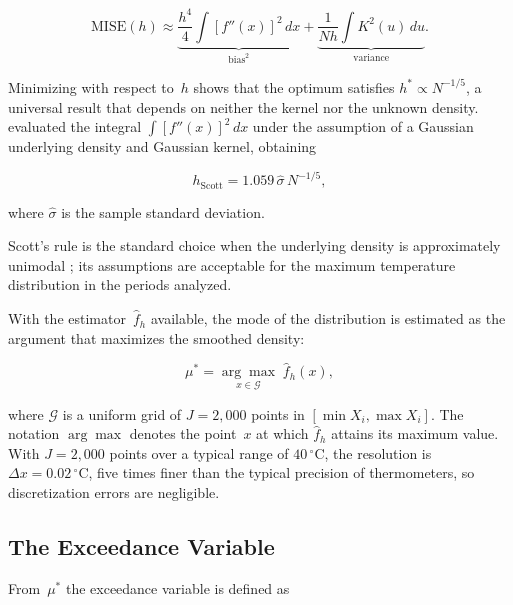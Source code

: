 \documentclass[APA,STIX1COL]{WileyNJD-v2}
\begin{document}
\begin{equation}\label{eq:mise}
\mathrm{MISE}(h)
  \approx \underbrace{\frac{h^4}{4}
            \int[f''(x)]^2\,dx}_{\mathrm{bias}^2}
  + \underbrace{\frac{1}{Nh}
            \int K^2(u)\,du}_{\mathrm{variance}}.
\end{equation}

\medskip

Minimizing with respect to~$h$ shows that the optimum satisfies
$h^*\propto N^{-1/5}$, a universal result that depends on neither
the kernel nor the unknown density. \citet{scott1992} evaluated
the integral $\int[f''(x)]^2\,dx$ under the assumption of a
Gaussian underlying density and Gaussian kernel, obtaining

\begin{equation}\label{eq:scott}
h_{\mathrm{Scott}} = 1.059\,\hat{\sigma}\,N^{-1/5},
\end{equation}

\medskip

where $\hat{\sigma}$ is the sample standard deviation.

Scott's rule is the standard choice when the underlying density
is approximately unimodal \citep{silverman1986}; its assumptions
are acceptable for the maximum temperature distribution in the
periods analyzed.

\medskip

With the estimator~$\hat{f}_h$ available, the mode of the
distribution is estimated as the argument that maximizes the
smoothed density:

\begin{equation}\label{eq:mustar}
\mu^* = \underset{x\in\mathcal{G}}{\arg\max}\;\hat{f}_h(x),
\end{equation}

where $\mathcal{G}$ is a uniform grid of $J=2{,}000$ points in
$[\min X_i, \max X_i]$. The notation $\arg\max$ denotes the
point~$x$ at which $\hat{f}_h$ attains its maximum value.
With $J=2{,}000$ points over a typical range of
$40\,{}^\circ\mathrm{C}$, the resolution is
$\Delta x=0.02\,{}^\circ\mathrm{C}$, five times finer than the
typical precision of thermometers, so discretization errors are
negligible.

\subsection{The Exceedance Variable}\label{subsec:excedencia}

From~$\mu^*$ the exceedance variable is defined as
\end{document}
